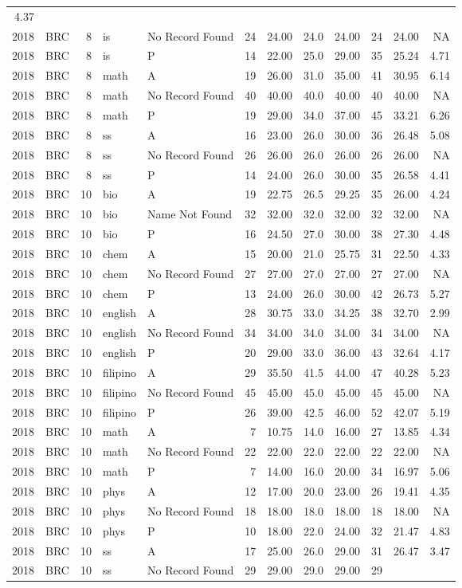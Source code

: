 \documentclass[]{article}
\begin{document}
\begin{longtable}[]{@{}rlrllrrrrrrr@{}}
4.37\tabularnewline
2018 & BRC & 8 & is & No Record Found & 24 & 24.00 & 24.0 & 24.00 & 24 &
24.00 & NA\tabularnewline
2018 & BRC & 8 & is & P & 14 & 22.00 & 25.0 & 29.00 & 35 & 25.24 &
4.71\tabularnewline
2018 & BRC & 8 & math & A & 19 & 26.00 & 31.0 & 35.00 & 41 & 30.95 &
6.14\tabularnewline
2018 & BRC & 8 & math & No Record Found & 40 & 40.00 & 40.0 & 40.00 & 40
& 40.00 & NA\tabularnewline
2018 & BRC & 8 & math & P & 19 & 29.00 & 34.0 & 37.00 & 45 & 33.21 &
6.26\tabularnewline
2018 & BRC & 8 & ss & A & 16 & 23.00 & 26.0 & 30.00 & 36 & 26.48 &
5.08\tabularnewline
2018 & BRC & 8 & ss & No Record Found & 26 & 26.00 & 26.0 & 26.00 & 26 &
26.00 & NA\tabularnewline
2018 & BRC & 8 & ss & P & 14 & 24.00 & 26.0 & 30.00 & 35 & 26.58 &
4.41\tabularnewline
2018 & BRC & 10 & bio & A & 19 & 22.75 & 26.5 & 29.25 & 35 & 26.00 &
4.24\tabularnewline
2018 & BRC & 10 & bio & Name Not Found & 32 & 32.00 & 32.0 & 32.00 & 32
& 32.00 & NA\tabularnewline
2018 & BRC & 10 & bio & P & 16 & 24.50 & 27.0 & 30.00 & 38 & 27.30 &
4.48\tabularnewline
2018 & BRC & 10 & chem & A & 15 & 20.00 & 21.0 & 25.75 & 31 & 22.50 &
4.33\tabularnewline
2018 & BRC & 10 & chem & No Record Found & 27 & 27.00 & 27.0 & 27.00 &
27 & 27.00 & NA\tabularnewline
2018 & BRC & 10 & chem & P & 13 & 24.00 & 26.0 & 30.00 & 42 & 26.73 &
5.27\tabularnewline
2018 & BRC & 10 & english & A & 28 & 30.75 & 33.0 & 34.25 & 38 & 32.70 &
2.99\tabularnewline
2018 & BRC & 10 & english & No Record Found & 34 & 34.00 & 34.0 & 34.00
& 34 & 34.00 & NA\tabularnewline
2018 & BRC & 10 & english & P & 20 & 29.00 & 33.0 & 36.00 & 43 & 32.64 &
4.17\tabularnewline
2018 & BRC & 10 & filipino & A & 29 & 35.50 & 41.5 & 44.00 & 47 & 40.28
& 5.23\tabularnewline
2018 & BRC & 10 & filipino & No Record Found & 45 & 45.00 & 45.0 & 45.00
& 45 & 45.00 & NA\tabularnewline
2018 & BRC & 10 & filipino & P & 26 & 39.00 & 42.5 & 46.00 & 52 & 42.07
& 5.19\tabularnewline
2018 & BRC & 10 & math & A & 7 & 10.75 & 14.0 & 16.00 & 27 & 13.85 &
4.34\tabularnewline
2018 & BRC & 10 & math & No Record Found & 22 & 22.00 & 22.0 & 22.00 &
22 & 22.00 & NA\tabularnewline
2018 & BRC & 10 & math & P & 7 & 14.00 & 16.0 & 20.00 & 34 & 16.97 &
5.06\tabularnewline
2018 & BRC & 10 & phys & A & 12 & 17.00 & 20.0 & 23.00 & 26 & 19.41 &
4.35\tabularnewline
2018 & BRC & 10 & phys & No Record Found & 18 & 18.00 & 18.0 & 18.00 &
18 & 18.00 & NA\tabularnewline
2018 & BRC & 10 & phys & P & 10 & 18.00 & 22.0 & 24.00 & 32 & 21.47 &
4.83\tabularnewline
2018 & BRC & 10 & ss & A & 17 & 25.00 & 26.0 & 29.00 & 31 & 26.47 &
3.47\tabularnewline
2018 & BRC & 10 & ss & No Record Found & 29 & 29.00 & 29.0 & 29.00 & 29

\end{longtable}
\end{document}
